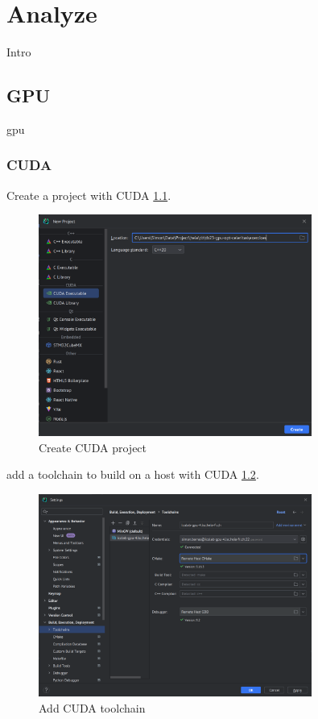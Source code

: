 \chapter{Analyze}
\label{ch:analyze}

Intro


\section{GPU}
\label{ch:analyze:gpu}

gpu


\subsection{CUDA}
\label{ch:analyze:gpu:cuda}

Create a project with CUDA \ref{fig:analyze:gpu:cuda:create_project}.

\begin{figure}[ht]
    \centering
    \includegraphics[width=0.8\textwidth]{05-resources/img/analyze/cuda-create_project.png}
    \caption{Create CUDA project}
    \label{fig:analyze:gpu:cuda:create_project}
\end{figure}

add a toolchain to build on a host with CUDA \ref{fig:analyze:gpu:cuda:add_toolchain}.

\begin{figure}[ht]
    \centering
    \includegraphics[width=0.8\textwidth]{05-resources/img/analyze/clion-toolchain.png}
    \caption{Add CUDA toolchain}
    \label{fig:analyze:gpu:cuda:add_toolchain}
\end{figure}


